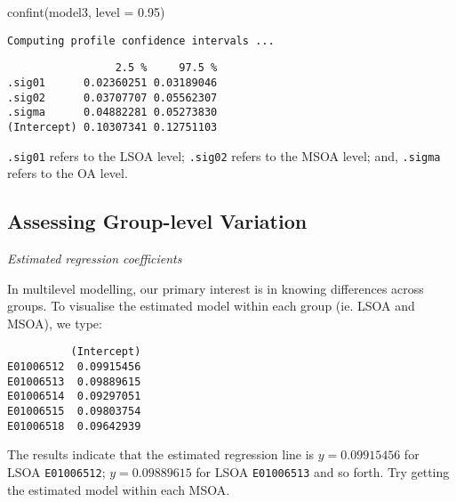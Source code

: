 \documentclass[
  letterpaper,
  krantz2]{style/krantz}
\newenvironment{Shaded}{\begin{snugshade}}{\end{snugshade}}
\newcommand{\AttributeTok}[1]{\textcolor[rgb]{0.40,0.45,0.13}{#1}}
\newcommand{\DecValTok}[1]{\textcolor[rgb]{0.68,0.00,0.00}{#1}}
\newcommand{\FloatTok}[1]{\textcolor[rgb]{0.68,0.00,0.00}{#1}}
\newcommand{\FunctionTok}[1]{\textcolor[rgb]{0.28,0.35,0.67}{#1}}
\newcommand{\NormalTok}[1]{\textcolor[rgb]{0.00,0.23,0.31}{#1}}
\newcommand{\OtherTok}[1]{\textcolor[rgb]{0.00,0.23,0.31}{#1}}
\newcommand{\SpecialCharTok}[1]{\textcolor[rgb]{0.37,0.37,0.37}{#1}}
\begin{document}
\begin{Shaded}
\begin{Highlighting}[]
\FunctionTok{confint}\NormalTok{(model3, }\AttributeTok{level =} \FloatTok{0.95}\NormalTok{)}
\end{Highlighting}
\end{Shaded}

\begin{verbatim}
Computing profile confidence intervals ...
\end{verbatim}

\begin{verbatim}
                 2.5 %     97.5 %
.sig01      0.02360251 0.03189046
.sig02      0.03707707 0.05562307
.sigma      0.04882281 0.05273830
(Intercept) 0.10307341 0.12751103
\end{verbatim}

\texttt{.sig01} refers to the LSOA level; \texttt{.sig02} refers to the
MSOA level; and, \texttt{.sigma} refers to the OA level.

\hypertarget{assessing-group-level-variation}{%
\subsection{Assessing Group-level
Variation}\label{assessing-group-level-variation}}

\emph{Estimated regression coefficients}

In multilevel modelling, our primary interest is in knowing differences
across groups. To visualise the estimated model within each group (ie.
LSOA and MSOA), we type:

\begin{Shaded}
\end{Shaded}

\begin{verbatim}
          (Intercept)
E01006512  0.09915456
E01006513  0.09889615
E01006514  0.09297051
E01006515  0.09803754
E01006518  0.09642939
\end{verbatim}

The results indicate that the estimated regression line is
\(y = 0.09915456\) for LSOA \texttt{E01006512}; \(y = 0.09889615\) for
LSOA \texttt{E01006513} and so forth. Try getting the estimated model
within each MSOA.
\end{document}
